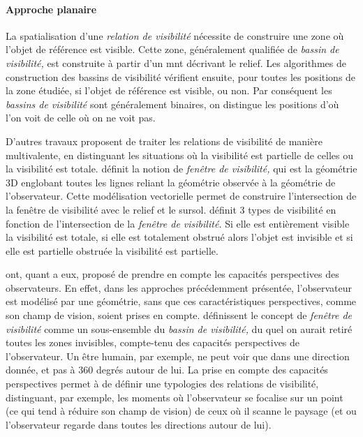
\paragraph{Approche planaire}

La spatialisation d'une \emph{relation de visibilité} nécessite de
construire une zone où l'objet de référence est visible. Cette zone,
généralement qualifiée de \emph{bassin de visibilité,} est construite
à partir d'un \ac{mnt} décrivant le relief. Les algorithmes de
construction des bassins de visibilité vérifient ensuite, pour toutes
les positions de la zone étudiée, si l'objet de référence est visible,
ou non. Par conséquent les \emph{bassins de visibilité} sont
généralement binaires, on distingue les positions d'où l'on voit de
celle où on ne voit pas.

D'autres travaux proposent de traiter les relations de visibilité de
manière multivalente, \ie en distinguant les situations où la
visibilité est partielle de celles ou la visibilité est
totale. \textcite{Ramos2003} définit la notion de \emph{fenêtre de
  visibilité,} qui est la géométrie 3D englobant toutes les lignes
reliant la géométrie observée à la géométrie de l'observateur. Cette
modélisation vectorielle permet de construire l'intersection de la
fenêtre de visibilité avec le relief et le
sursol. \textcite{Ramos2003} définit 3 types de visibilité en fonction
de l'intersection de la \emph{fenêtre de visibilité.} Si elle est
entièrement visible la visibilité est totale, si elle est totalement
obstrué alors l'objet est invisible et si elle est partielle obstruée
la visibilité est partielle.

\textcite{Lonergan2016} ont, quant a eux, proposé de prendre en compte
les capacités perspectives des observateurs. En effet, dans les
approches précédemment présentée, l'observateur est modélisé par une
géométrie, sans que ces caractéristiques perspectives, comme son champ
de vision, soient prises en compte. \textcite{Lonergan2016}
définissent le concept de \emph{fenêtre de visibilité} comme un
sous-ensemble du \emph{bassin de visibilité,} du quel on aurait retiré
toutes les zones invisibles, compte-tenu des capacités perspectives de
l'observateur. Un être humain, par exemple, ne peut voir que dans une
direction donnée, et pas à 360 degrés autour de lui. La prise en
compte des capacités perspectives permet à \textcite{Lonergan2016} de
définir une typologies des relations de visibilité, distinguant, par
exemple, les moments où l'observateur se focalise sur un point (ce qui
tend à réduire son champ de vision) de ceux où il scanne le paysage
(et ou l'observateur regarde dans toutes les directions autour de
lui).

